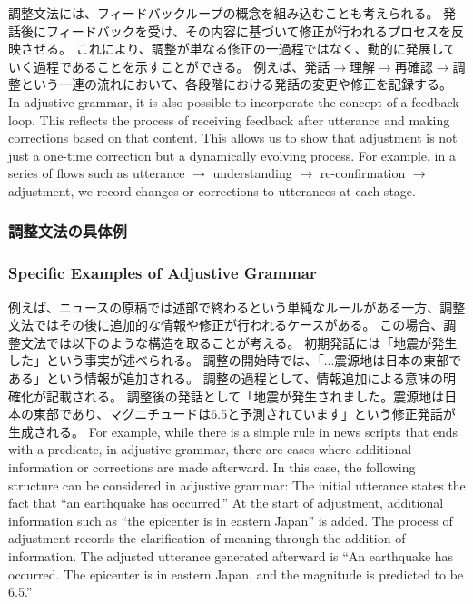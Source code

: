 \documentclass[a4paper,xelatex,ja=standard]{bxjsarticle}
\begin{document}
\ifJPN
調整文法には、フィードバックループの概念を組み込むことも考えられる。
発話後にフィードバックを受け、その内容に基づいて修正が行われるプロセスを反映させる。
これにより、調整が単なる修正の一過程ではなく、動的に発展していく過程であることを示すことができる。
例えば、発話$\rightarrow$理解$\rightarrow$再確認$\rightarrow$調整という一連の流れにおいて、各段階における発話の変更や修正を記録する。
\else
In adjustive grammar, it is also possible to incorporate the concept of a feedback loop.
This reflects the process of receiving feedback after utterance and making corrections based on that content.
This allows us to show that adjustment is not just a one-time correction but a dynamically evolving process.
For example, in a series of flows such as utterance $\rightarrow$ understanding $\rightarrow$ re-confirmation $\rightarrow$ adjustment, we record changes or corrections to utterances at each stage.
\fi

\ifJPN
\subsubsection{調整文法の具体例}
\else
\subsubsection{Specific Examples of Adjustive Grammar}
\fi

\ifJPN
例えば、ニュースの原稿では述部で終わるという単純なルールがある一方、調整文法ではその後に追加的な情報や修正が行われるケースがある。
この場合、調整文法では以下のような構造を取ることが考える。
初期発話には「地震が発生した」という事実が述べられる。
調整の開始時では、「...震源地は日本の東部である」という情報が追加される。
調整の過程として、情報追加による意味の明確化が記載される。
調整後の発話として「地震が発生されました。震源地は日本の東部であり、マグニチュードは6.5と予測されています」という修正発話が生成される。
\else
For example, while there is a simple rule in news scripts that ends with a predicate, in adjustive grammar, there are cases where additional information or corrections are made afterward.
In this case, the following structure can be considered in adjustive grammar:
The initial utterance states the fact that ``an earthquake has occurred.''
At the start of adjustment, additional information such as ``the epicenter is in eastern Japan'' is added.
The process of adjustment records the clarification of meaning through the addition of information.
The adjusted utterance generated afterward is ``An earthquake has occurred. The epicenter is in eastern Japan, and the magnitude is predicted to be 6.5.''
\fi
\end{document}
